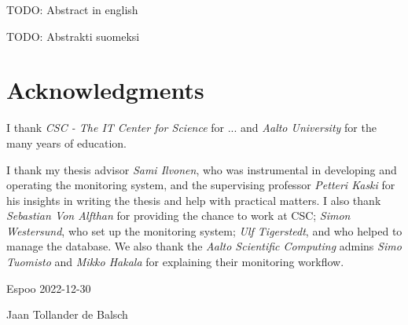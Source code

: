 \makecoverpage
\makecopyrightpage


\begin{abstractpage}[english]
TODO: Abstract in english
\end{abstractpage}



\begin{abstractpage}[finnish]
TODO: Abstrakti suomeksi
\end{abstractpage}


\section*{Acknowledgments}
I thank \emph{CSC - The IT Center for Science} for ... and \emph{Aalto University} for the many years of education.

I thank my thesis advisor \emph{Sami Ilvonen}, who was instrumental in developing and operating the monitoring system, and the supervising professor \emph{Petteri Kaski} for his insights in writing the thesis and help with practical matters.
I also thank \emph{Sebastian Von Alfthan} for providing the chance to work at CSC; \emph{Simon Westersund}, who set up the monitoring system; \emph{Ulf Tigerstedt}, and who helped to manage the database.
We also thank the \emph{Aalto Scientific Computing} admins \emph{Simo Tuomisto} and \emph{Mikko Hakala} for explaining their monitoring workflow.

\vspace{5cm}
Espoo 2022-12-30

\vspace{5mm}
{\hfill Jaan Tollander de Balsch \hspace{1cm}}

\newpage

\setcounter{tocdepth}{2}
\tableofcontents
